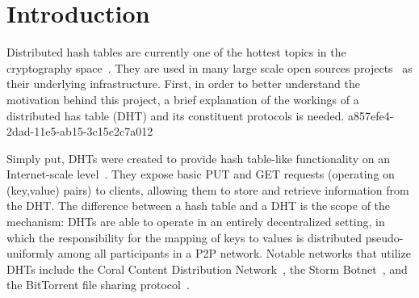 \documentclass[12pt]{article}
\begin{document}
\section{Introduction}
\par Distributed hash tables are currently one of the hottest topics in the cryptography space~\cite{Stoica:2001dj,Rowstron:2001ea,Ratnasamy:2001wn}. They are used in many large scale open sources projects~\cite{Freitas:2013tb,Xu:2010vs,Perfitt:2010fh} as their underlying infrastructure. First, in order to better understand the motivation behind this project, a brief explanation of the workings of a distributed has table (DHT) and its constituent protocols is needed.
a857efe4-2dad-11e5-ab15-3c15c2c7a012
\par Simply put, DHTs were created to provide hash table-like functionality on an Internet-scale level~\cite{Ratnasamy:2001wn}. They expose basic PUT and GET requests (operating on (key,value) pairs) to clients, allowing them to store and retrieve information from the DHT. The difference between a hash table and a DHT is the scope of the mechanism: DHTs are able to operate in an entirely decentralized setting, in which the responsibility for the mapping of keys to values is distributed pseudo-uniformly among all participants in a P2P network. Notable networks that utilize DHTs include the Coral Content Distribution Network~\cite{Freedman:2004vb}, the Storm Botnet~\cite{Holz:2008uk}, and the BitTorrent file sharing protocol~\cite{Cohen:y1_8mBnw}.
\end{document}

